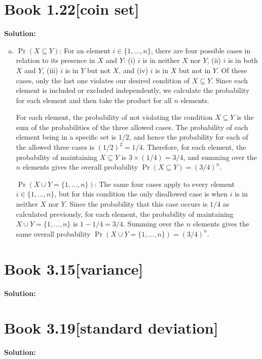 \documentclass[11pt]{article}
\newenvironment{question}[2]
{\newpage\section{#1\texorpdfstring{\hfill}{horizontal spacing}{\rm\normalsize #2}}}{}
\newenvironment{solution}
{\textbf{Solution: }\color{blue}}
{\color{black}}
\begin{document}
\begin{question}{Book 1.22}{[coin set]}
\begin{solution}
\begin{enumerate}[(a)]
    \item \(\Pr(X \subseteq Y)\): For an element \(i \in \{1,\ldots,n\}\), there are four possible cases in relation to its presence in \(X\) and \(Y\): (i) \(i\) is in neither \(X\) nor \(Y\), (ii) \(i\) is in both \(X\) and \(Y\), (iii) \(i\) is in \(Y\) but not \(X\), and (iv) \(i\) is in \(X\) but not in \(Y\). Of these cases, only the last one violates our desired condition of \(X \subseteq Y\). Since each element is included or excluded independently, we calculate the probability for each element and then take the product for all \(n\) elements.

    For each element, the probability of not violating the condition \(X \subseteq Y\) is the sum of the probabilities of the three allowed cases. The probability of each element being in a specific set is \(1/2\), and hence the probability for each of the allowed three cases is \((1/2)^2=1/4\). Therefore, for each element, the probability of maintaining \(X \subseteq Y\) is \(3 \times (1/4)=3/4\), and summing over the \(n\) elements gives the overall probability \(\Pr(X \subseteq Y)=(3/4)^n\).

    \(\Pr(X \cup Y = \{1,\ldots,n\})\): The same four cases apply to every element \(i \in \{1,\ldots,n\}\), but for this condition the only disallowed case is when \(i\) is in neither \(X\) nor \(Y\). Since the probability that this case occurs is \(1/4\) as calculated previously, for each element, the probability of maintaining \(X \cup Y = \{1,\ldots,n\}\) is \(1-1/4=3/4\). Summing over the \(n\) elements gives the same overall probability \(\Pr(X \cup Y = \{1,\ldots,n\})=(3/4)^n\).
\end{enumerate}

\end{solution}
\end{question}


\begin{question}{Book 3.15}{[variance]}


\begin{solution}


\end{solution}
\end{question}


\begin{question}{Book 3.19}{[standard deviation]}


\begin{solution}


\end{solution}
\end{question}
\end{document}
